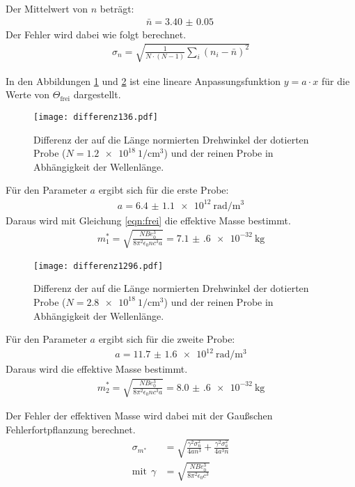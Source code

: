 Der Mittelwert von $n$ beträgt:
\begin{align*}
  \bar{n} = \SI{3.40(5)}{}
\end{align*}
Der Fehler wird dabei wie folgt berechnet.
\begin{align*}
  \sigma_n = \sqrt{\frac{1}{N\cdot(N-1)} \sum_i (n_i - \bar{n})^2}
\end{align*}

In den Abbildungen \ref{fig:differenz136} und \ref{fig:differenz1296} ist eine lineare
Anpassungsfunktion $y=a \cdot x$ für die Werte von $\Theta_{\mathrm{frei}}$ dargestellt.

\begin{figure}[H]
  \centering
  \texttt{[image: differenz136.pdf]}
  \caption{Differenz der auf die Länge normierten Drehwinkel der dotierten Probe ($N = \SI{1.2e18}{1\per\centi\meter^3}$) und der reinen Probe in Abhängigkeit der Wellenlänge.}
  \label{fig:differenz136}
\end{figure}

Für den Parameter $a$ ergibt sich für die erste Probe:
\begin{align*}
  a = \SI{6.4(11)e12}{\radian\per\meter^3}
\end{align*}
Daraus wird mit Gleichung \ref{eqn:frei} die effektive Masse bestimmt.
\begin{align*}
  m^*_1 = \sqrt{\frac{NB e^3_0}{8 \pi^2 \epsilon_0 n c^3 a}} = \SI{7.1(6)e-32}{\kilo\gram}
\end{align*}


\begin{figure}[H]
  \centering
  \texttt{[image: differenz1296.pdf]}
  \caption{Differenz der auf die Länge normierten Drehwinkel der dotierten Probe ($N = \SI{2.8e18}{1\per\centi\meter^3}$) und der reinen Probe in Abhängigkeit der Wellenlänge.}
  \label{fig:differenz1296}
\end{figure}


Für den Parameter $a$ ergibt sich für die zweite Probe:
\begin{align*}
  a = \SI{11.7(16)e12}{\radian\per\meter^3}
\end{align*}
Daraus wird die effektive Masse bestimmt.
\begin{align*}
  m^*_2 = \sqrt{\frac{NB e^3_0}{8 \pi^2 \epsilon_0 n c^3 a}} = \SI{8.0(6)e-32}{\kilo\gram}
\end{align*}


Der Fehler der effektiven Masse wird dabei mit der Gaußschen Fehlerfortpflanzung berechnet.
\begin{align*}
  \sigma_{m^*} &= \sqrt{\frac{\gamma^{2} \sigma_{n}^{2}}{4 a n^{3}}  + \frac{\gamma^{2} \sigma_{a}^{2}}{4 a^{3} n}} \\
  \text{mit}\:\: \gamma &= \sqrt{\frac{NB e^3_0}{8 \pi^2 \epsilon_0 c^3}}
\end{align*}
